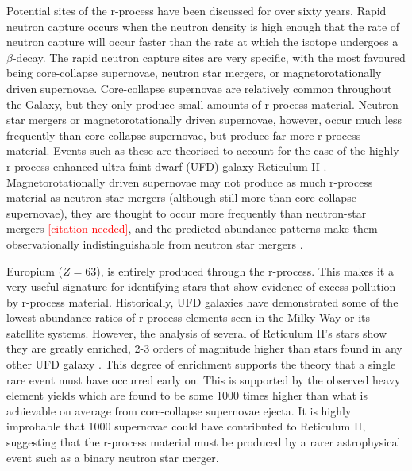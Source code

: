 \documentclass[a4paper,fleqn,usenatbib]{mnras}
\newcommand{\todo}[1]{\textcolor{red}{#1}}
\begin{document}
	Potential sites of the r-process have been discussed for over sixty years. Rapid neutron capture occurs when the neutron density is high enough that the rate of neutron capture will occur faster than the rate at which the isotope undergoes a $\beta$-decay. The rapid neutron capture sites are very specific, with the most favoured being core-collapse supernovae, neutron star mergers, or magnetorotationally driven supernovae. Core-collapse supernovae are relatively common throughout the Galaxy, but they only produce small amounts of r-process material. Neutron star mergers or magnetorotationally driven supernovae, however, occur much less frequently than core-collapse supernovae, but produce far more r-process material. Events such as these are theorised to account for the case of the highly r-process enhanced ultra-faint dwarf (UFD) galaxy Reticulum II \citep{Ji2016}. %
Magnetorotationally driven supernovae may not produce as much r-process material as neutron star mergers (although still more than core-collapse supernovae), they are thought to occur more frequently than neutron-star mergers \todo{[citation needed]}, and the predicted abundance patterns make them observationally indistinguishable from neutron star mergers \citep{Ji2016}.
	
	Europium ($Z=63$), is entirely produced through the r-process. This makes it a very useful signature for identifying stars that show evidence of excess pollution by r-process material. %
	Historically, UFD galaxies have demonstrated some of the lowest abundance ratios of r-process elements seen in the Milky Way or its satellite systems. However, the analysis of several of Reticulum II's stars show they are greatly enriched, 2-3 orders of magnitude higher than stars found in any other UFD galaxy \citep{Ji2016}. This degree of enrichment supports the theory that a single rare event must have occurred early on. This is supported by the observed heavy element yields which are found to be some 1000 times higher than what is achievable on average from core-collapse supernovae ejecta. It is highly improbable that 1000 supernovae could have contributed to Reticulum II, suggesting that the r-process material must be produced by a rarer astrophysical event such as a binary neutron star merger.
	
\end{document}
